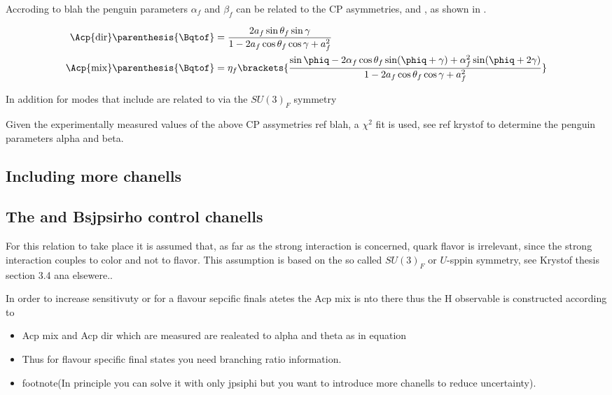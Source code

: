 Accroding to blah the penguin parameters $\alpha_f$ and $\beta_f$ can be related to the CP asymmetries,  and ,
as shown in \equref{}.

\begin{align}
  \Acp{\rm dir}\parenthesis{\Bqtof} &= \frac{ 2a_f \sin\theta_f \sin\gamma} {1-2a_f \cos\theta_f \cos\gamma+a_f^{2}} \\
  \Acp{\rm mix}\parenthesis{\Bqtof} &= \eta_f \brackets{\frac{\sin\phiq - 2\alpha_f \cos\theta_f\sin(\phiq+\gamma) + \alpha_f^2 \sin(\phiq+2\gamma)} {1-2a_f \cos\theta_f \cos\gamma+a_f^{2}} }
  \label{bsjpsiphi_amp_param_defs_II}
\end{align}

In addition for modes that include are related to \BsJpsiPhi via the $SU(3)_F$ symmetry


 Given the experimentally measured values of the above CP assymetries {\color{red} ref blah}, a $\chi^2$ fit is
used, see ref {\color{red} krystof} to determine the penguin parameters alpha and beta.

\subsection{Including more chanells}
\subsection{The \BsJpsiKst and Bsjpsirho control chanells}
For this relation to take place it is assumed that, as far as the strong interaction is concerned, quark flavor is irrelevant,
since the strong interaction couples to color and not to flavor. This assumption is based on the so called $SU(3)_F$ or $U$-sppin symmetry,
see {\color{red} Krystof thesis section 3.4 ana elsewere.}.

In order to increase sensitivuty or for a flavour sepcific finals atetes the Acp mix is nto there thus the H observable is constructed
according to

\begin{itemize}
  \item Acp mix and Acp dir which are measured are realeated to alpha and theta as in equation
  \item Thus for flavour specific final states you need branching ratio information.
  \item footnote(In principle you can solve it with only jpsiphi but you want to introduce more chanells to reduce uncertainty).
\end{itemize}


